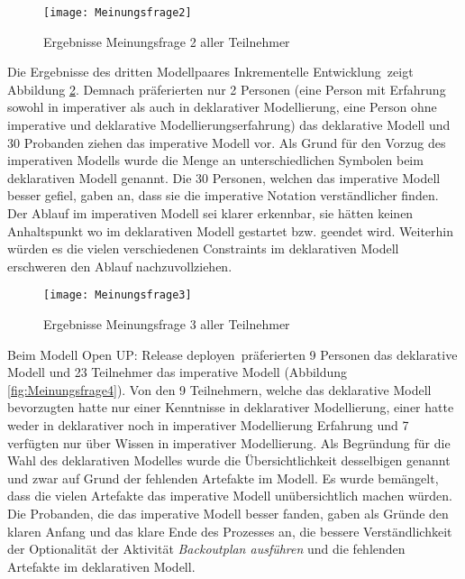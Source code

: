 \begin{figure}[htp]
\begin{center}
  \texttt{[image: Meinungsfrage2]} %
  \caption{Ergebnisse Meinungsfrage 2 aller Teilnehmer}
  \label{fig:Meinungsfrage2}
\end{center}
\end{figure}

Die Ergebnisse des dritten Modellpaares \grqq Inkrementelle Entwicklung\grqq \ zeigt Abbildung \ref{fig:Meinungsfrage3}. Demnach präferierten nur 2 Personen (eine Person mit Erfahrung sowohl in imperativer als auch in deklarativer Modellierung, eine Person ohne imperative und deklarative Modellierungserfahrung) das deklarative Modell und 30 Probanden ziehen das imperative Modell vor.\newline
Als Grund für den Vorzug des imperativen Modells wurde die Menge an unterschiedlichen Symbolen beim deklarativen Modell genannt. \newline
Die 30 Personen, welchen das imperative Modell besser gefiel, gaben an, dass sie die imperative Notation verständlicher finden. Der Ablauf im imperativen Modell sei klarer erkennbar, sie hätten keinen Anhaltspunkt wo im deklarativen Modell gestartet bzw. geendet wird. Weiterhin würden es die vielen verschiedenen Constraints im deklarativen Modell erschweren den Ablauf nachzuvollziehen.\newline

\begin{figure}[htp]
\begin{center}
  \texttt{[image: Meinungsfrage3]} %
  \caption{Ergebnisse Meinungsfrage 3 aller Teilnehmer}
  \label{fig:Meinungsfrage3}
\end{center}
\end{figure}

Beim Modell \grqq Open UP: Release deployen\grqq \ präferierten 9 Personen das deklarative Modell und 23 Teilnehmer das imperative Modell (Abbildung \ref{fig:Meinungsfrage4}). Von den 9 Teilnehmern, welche das deklarative Modell bevorzugten hatte nur einer Kenntnisse in deklarativer Modellierung, einer hatte weder in deklarativer noch in imperativer Modellierung Erfahrung und 7 verfügten nur über Wissen in imperativer Modellierung. \newline
Als Begründung für die Wahl des deklarativen Modelles wurde die Übersichtlichkeit desselbigen genannt und zwar auf Grund der fehlenden Artefakte im Modell. Es wurde bemängelt, dass die vielen Artefakte das imperative Modell unübersichtlich machen würden.\newline
Die Probanden, die das imperative Modell besser fanden, gaben als Gründe den klaren Anfang und das klare Ende des Prozesses an, die bessere Verständlichkeit der Optionalität der Aktivität \textit{Backoutplan ausführen} und die fehlenden Artefakte im deklarativen Modell. \newline



